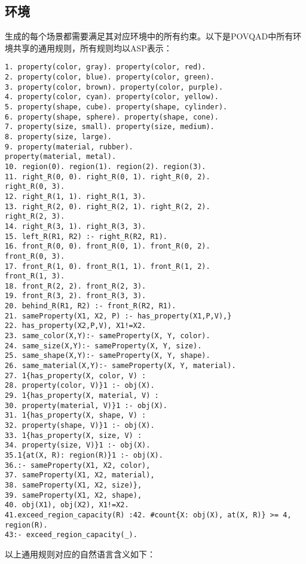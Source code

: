 \subsection{环境}
\label{appendix:environment}
生成的每个场景都需要满足其对应环境中的所有约束。以下是POVQAD中所有环境共享的通用规则，所有规则均以ASP表示：
\begin{lstlisting}
1. property(color, gray). property(color, red).
2. property(color, blue). property(color, green).
3. property(color, brown). property(color, purple).
4. property(color, cyan). property(color, yellow).
5. property(shape, cube). property(shape, cylinder).
6. property(shape, sphere). property(shape, cone).
7. property(size, small). property(size, medium).
8. property(size, large).
9. property(material, rubber).
property(material, metal).
10. region(0). region(1). region(2). region(3).
11. right_R(0, 0). right_R(0, 1). right_R(0, 2).
right_R(0, 3).
12. right_R(1, 1). right_R(1, 3).
13. right_R(2, 0). right_R(2, 1). right_R(2, 2).
right_R(2, 3).
14. right_R(3, 1). right_R(3, 3).
15. left_R(R1, R2) :- right_R(R2, R1).
16. front_R(0, 0). front_R(0, 1). front_R(0, 2).
front_R(0, 3).
17. front_R(1, 0). front_R(1, 1). front_R(1, 2).
front_R(1, 3).
18. front_R(2, 2). front_R(2, 3).
19. front_R(3, 2). front_R(3, 3).
20. behind_R(R1, R2) :- front_R(R2, R1).
21. sameProperty(X1, X2, P) :- has_property(X1,P,V),}
22. has_property(X2,P,V), X1!=X2.
23. same_color(X,Y):- sameProperty(X, Y, color).
24. same_size(X,Y):- sameProperty(X, Y, size).
25. same_shape(X,Y):- sameProperty(X, Y, shape).
26. same_material(X,Y):- sameProperty(X, Y, material).
27. 1{has_property(X, color, V) :
28. property(color, V)}1 :- obj(X).
29. 1{has_property(X, material, V) :
30. property(material, V)}1 :- obj(X).
31. 1{has_property(X, shape, V) :
32. property(shape, V)}1 :- obj(X).
33. 1{has_property(X, size, V) :
34. property(size, V)}1 :- obj(X).
35.1{at(X, R): region(R)}1 :- obj(X).
36.:- sameProperty(X1, X2, color),
37. sameProperty(X1, X2, material),
38. sameProperty(X1, X2, size)},
39. sameProperty(X1, X2, shape),
40. obj(X1), obj(X2), X1!=X2.
41.exceed_region_capacity(R) :42. #count{X: obj(X), at(X, R)} >= 4, region(R).
43:- exceed_region_capacity(_).
\end{lstlisting}
以上通用规则对应的自然语言含义如下：
